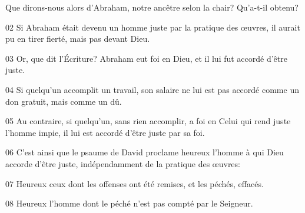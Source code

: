 Que dirons-nous alors d’Abraham, notre ancêtre selon la chair? Qu’a-t-il obtenu?

02 Si Abraham était devenu un homme juste par la pratique des œuvres, il aurait pu en tirer fierté, mais pas devant Dieu.

03 Or, que dit l’Écriture? Abraham eut foi en Dieu, et il lui fut accordé d’être juste.

04 Si quelqu’un accomplit un travail, son salaire ne lui est pas accordé comme un don gratuit, mais comme un dû.

05 Au contraire, si quelqu’un, sans rien accomplir, a foi en Celui qui rend juste l’homme impie, il lui est accordé d’être juste par sa foi.

06 C’est ainsi que le psaume de David proclame heureux l’homme à qui Dieu accorde d’être juste, indépendamment de la pratique des œuvres:

07 Heureux ceux dont les offenses ont été remises, et les péchés, effacés.

08 Heureux l’homme dont le péché n’est pas compté par le Seigneur.
